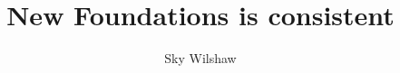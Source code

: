 \documentclass{report}
\title{New Foundations is consistent}
\author{Sky Wilshaw}
\begin{document}
\maketitle



\newline


\end{document}
